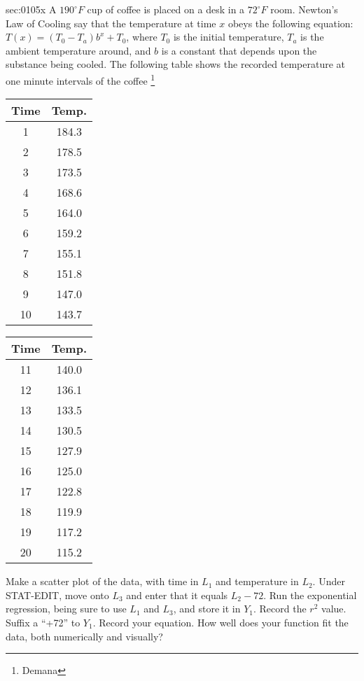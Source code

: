 \begin{multicols*}{2}
\begin{exercises}{sec:0105x}
\prob[0105newton] A $190^\circ F$ cup of coffee is placed on a desk in a $72^\circ F$ room.
Newton's Law of Cooling say that the temperature at time $x$ obeys the
following equation: $T(x) = (T_0-T_a)b^x+T_0$, where $T_0$ is the
initial temperature, $T_a$ is the ambient temperature around, and $b$ is 
a constant that depends upon the substance being cooled.  The following
table shows the recorded temperature at one minute intervals of the coffee
\footnote{Demana}
\begin{tabular}{c|c}
	\textbf{Time} & \textbf{Temp.} \\ \hline
	1 & 184.3 \\
	2 & 178.5 \\
	3 & 173.5 \\
	4 & 168.6 \\
	5 & 164.0 \\
	6 & 159.2 \\
	7 & 155.1 \\
	8 & 151.8\\
	9 & 147.0\\
	10 & 143.7\\
\end{tabular}
\begin{tabular}{c|c}
	\textbf{Time} & \textbf{Temp.} \\ \hline
	11 & 140.0\\
	12 & 136.1 \\
	13 & 133.5 \\
	14 & 130.5\\
	15 & 127.9 \\
	16 & 125.0\\
	17 & 122.8\\
	18 & 119.9\\
	19 & 117.2\\
	20 & 115.2\\
\end{tabular}


\subprob Make a scatter plot of the data, with time in $L_1$ and temperature
in $L_2$.
\subprob Under STAT-EDIT, move onto $L_3$ and enter that it equals $L_2-72$.  Run the exponential regression, being sure to use $L_1$ and $L_3$, and store it in $Y_1$.  Record the $r^2$ value.
\subprob Suffix a ``+72'' to $Y_1$.  Record your equation.  
\subprob How well does your function fit the data, both numerically and visually?

   
\end{exercises}
\end{multicols*}

